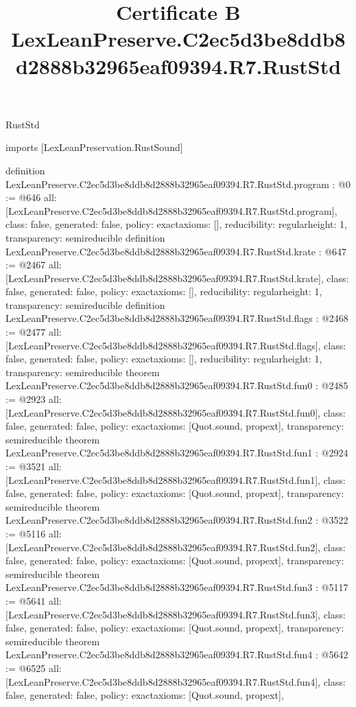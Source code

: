\begin{lexlean}{RustStd}
\title{Certificate B LexLeanPreserve.C2ec5d3be8ddb8d2888b32965eaf09394.R7.RustStd}
\begin{coremodule}
imports [LexLeanPreservation.RustSound]

definition LexLeanPreserve.C2ec5d3be8ddb8d2888b32965eaf09394.R7.RustStd.program : @0 := @646 {
  all: [LexLeanPreserve.C2ec5d3be8ddb8d2888b32965eaf09394.R7.RustStd.program],
  class: false,
  generated: false,
  policy: exact{axioms: []},
  reducibility: regular{height: 1},
  transparency: semireducible
}
definition LexLeanPreserve.C2ec5d3be8ddb8d2888b32965eaf09394.R7.RustStd.krate : @647 := @2467 {
  all: [LexLeanPreserve.C2ec5d3be8ddb8d2888b32965eaf09394.R7.RustStd.krate],
  class: false,
  generated: false,
  policy: exact{axioms: []},
  reducibility: regular{height: 1},
  transparency: semireducible
}
definition LexLeanPreserve.C2ec5d3be8ddb8d2888b32965eaf09394.R7.RustStd.flags : @2468 := @2477 {
  all: [LexLeanPreserve.C2ec5d3be8ddb8d2888b32965eaf09394.R7.RustStd.flags],
  class: false,
  generated: false,
  policy: exact{axioms: []},
  reducibility: regular{height: 1},
  transparency: semireducible
}
theorem LexLeanPreserve.C2ec5d3be8ddb8d2888b32965eaf09394.R7.RustStd.fun0 : @2485 := @2923 {
  all: [LexLeanPreserve.C2ec5d3be8ddb8d2888b32965eaf09394.R7.RustStd.fun0],
  class: false,
  generated: false,
  policy: exact{axioms: [Quot.sound, propext]},
  transparency: semireducible
}
theorem LexLeanPreserve.C2ec5d3be8ddb8d2888b32965eaf09394.R7.RustStd.fun1 : @2924 := @3521 {
  all: [LexLeanPreserve.C2ec5d3be8ddb8d2888b32965eaf09394.R7.RustStd.fun1],
  class: false,
  generated: false,
  policy: exact{axioms: [Quot.sound, propext]},
  transparency: semireducible
}
theorem LexLeanPreserve.C2ec5d3be8ddb8d2888b32965eaf09394.R7.RustStd.fun2 : @3522 := @5116 {
  all: [LexLeanPreserve.C2ec5d3be8ddb8d2888b32965eaf09394.R7.RustStd.fun2],
  class: false,
  generated: false,
  policy: exact{axioms: [Quot.sound, propext]},
  transparency: semireducible
}
theorem LexLeanPreserve.C2ec5d3be8ddb8d2888b32965eaf09394.R7.RustStd.fun3 : @5117 := @5641 {
  all: [LexLeanPreserve.C2ec5d3be8ddb8d2888b32965eaf09394.R7.RustStd.fun3],
  class: false,
  generated: false,
  policy: exact{axioms: [Quot.sound, propext]},
  transparency: semireducible
}
theorem LexLeanPreserve.C2ec5d3be8ddb8d2888b32965eaf09394.R7.RustStd.fun4 : @5642 := @6525 {
  all: [LexLeanPreserve.C2ec5d3be8ddb8d2888b32965eaf09394.R7.RustStd.fun4],
  class: false,
  generated: false,
  policy: exact{axioms: [Quot.sound, propext]},
}
\end{coremodule}
\end{lexlean}
